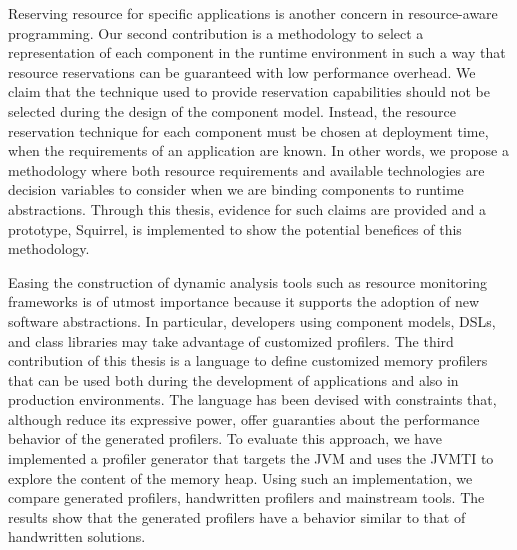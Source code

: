 Reserving resource for specific applications is another concern in resource-aware programming.
Our second contribution is a methodology to select a representation of each component in the runtime environment in such a way that resource reservations can be guaranteed with low performance overhead.
We claim that the technique used to provide reservation capabilities should not be selected during the design of the component model.
Instead, the resource reservation technique for each component must be chosen at deployment time, when the requirements of an application are known.
In other words, we propose a methodology where both resource requirements and available technologies are decision variables to consider when we are binding components to runtime abstractions.
Through this thesis, evidence for such claims are provided and a prototype, Squirrel, is implemented to show the potential benefices of this methodology.


Easing the construction of dynamic analysis tools such as resource monitoring frameworks is of utmost importance because it supports the adoption of new software abstractions.
In particular, developers using component models, DSLs, and class libraries may take advantage of customized profilers.
The third contribution of this thesis is a language to define customized memory profilers that can be used both during the development of applications and also in production environments.
The language has been devised with constraints that, although reduce its expressive power, offer guaranties about the performance behavior of the generated profilers.
To evaluate this approach, we have implemented a profiler generator that targets the JVM and uses the JVMTI to explore the content of the memory heap.
Using such an implementation, we compare generated profilers, handwritten profilers and mainstream tools.
The results show that the generated profilers have a behavior similar to that of handwritten solutions.

